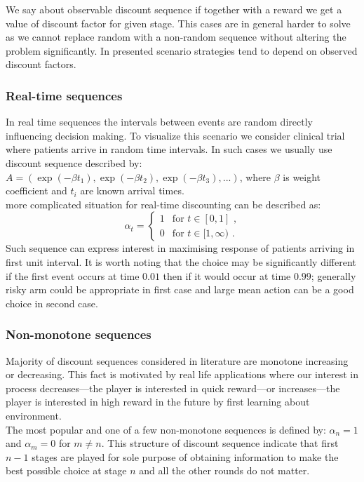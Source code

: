 \documentclass[12pt, a4paper, pdflatex, leqno]{report}
\begin{document}
We say about observable discount sequence if together with a reward we get a value of discount factor for given stage. This cases are in general harder to solve as we cannot replace random with a non-random sequence without altering the problem significantly. In presented scenario strategies tend to depend on observed discount factors.\\

\subsubsection{Real-time sequences}
In real time sequences the intervals between events are random directly influencing decision making. To visualize this scenario we consider clinical trial where patients arrive in random time intervals. In such cases we usually use discount sequence described by: $A = ( \exp(-\beta t_1), \exp(-\beta t_2), \exp(-\beta t_3),... )$, where $\beta$ is weight coefficient and $t_i$ are known arrival times.\\
more complicated situation for real-time discounting can be described as:
$$
  \alpha_t =
    \begin{cases}
      1 & \text{for } t \in [0,1] \text{ ,} \\
      0 & \text{for } t \in [1,\infty) \text{ .}
    \end{cases}
$$
Such sequence can express interest in maximising response of patients arriving in first unit interval. It is worth noting that the choice may be significantly different if the first event occurs at time $0.01$ then if it would occur at time $0.99$; generally risky arm could be appropriate in first case and large mean action can be a good choice in second case.\\

\subsubsection{Non-monotone sequences}
Majority of discount sequences considered in literature are monotone increasing or decreasing. This fact is motivated by real life applications where our interest in process decreases---the player is interested in  quick reward---or increases---the player is interested in high reward in the future by first learning about environment.\\
The most popular and one of a few non-monotone sequences is defined by: $\alpha_n = 1$ and $\alpha_m = 0$ for $m \neq n$. This structure of discount sequence indicate that first $n-1$ stages are played for sole purpose of obtaining information to make the best possible choice at stage $n$ and all the other rounds do not matter.\\
\end{document}
